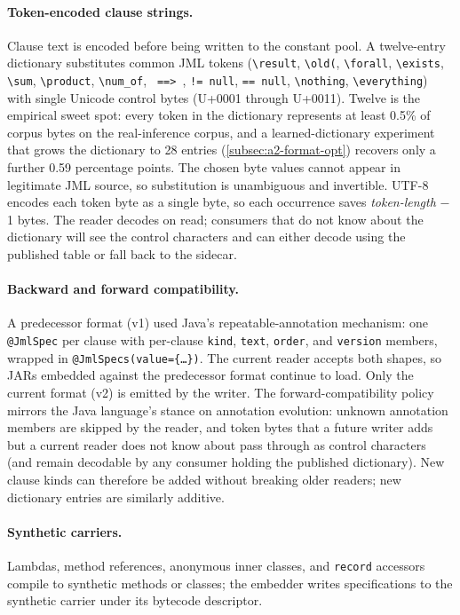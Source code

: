 \paragraph{Token-encoded clause strings.}
Clause text is encoded before being written to the constant pool. A twelve-entry
dictionary substitutes common JML tokens (\texttt{\textbackslash result},
\texttt{\textbackslash old(}, \texttt{\textbackslash forall},
\texttt{\textbackslash exists}, \texttt{\textbackslash sum},
\texttt{\textbackslash product}, \texttt{\textbackslash num\_of},
\texttt{ ==> }, \texttt{!= null}, \texttt{== null},
\texttt{\textbackslash nothing}, \texttt{\textbackslash everything}) with single
Unicode control bytes (U+0001 through U+0011). Twelve is the empirical sweet
spot: every token in the dictionary represents at least 0.5\% of corpus bytes on
the real-inference corpus, and a learned-dictionary experiment that grows the
dictionary to 28 entries (\cref{subsec:a2-format-opt}) recovers only a further
0.59 percentage points. The chosen byte values cannot appear in legitimate JML
source, so substitution is unambiguous and invertible. UTF-8 encodes each token
byte as a single byte, so each occurrence saves \emph{token-length} $-$ 1 bytes.
The reader decodes on read; consumers that do not know about the dictionary will
see the control characters and can either decode using the published table or
fall back to the sidecar.

\paragraph{Backward and forward compatibility.}
A predecessor format (v1) used Java's repeatable-annotation mechanism: one
\texttt{@JmlSpec} per clause with per-clause \texttt{kind}, \texttt{text},
\texttt{order}, and \texttt{version} members, wrapped in
\texttt{@JmlSpecs(value=\{\dots\})}. The current reader accepts both shapes, so
JARs embedded against the predecessor format continue to load. Only the current
format (v2) is emitted by the writer. The forward-compatibility policy mirrors
the Java language's stance on annotation evolution: unknown annotation members
are skipped by the reader, and token bytes that a future writer adds but a
current reader does not know about pass through as control characters (and
remain decodable by any consumer holding the published dictionary). New clause
kinds can therefore be added without breaking older readers; new dictionary
entries are similarly additive.

\paragraph{Synthetic carriers.}
Lambdas, method references, anonymous inner classes, and \texttt{record}
accessors compile to synthetic methods or classes; the embedder writes
specifications to the synthetic carrier under its bytecode descriptor.

